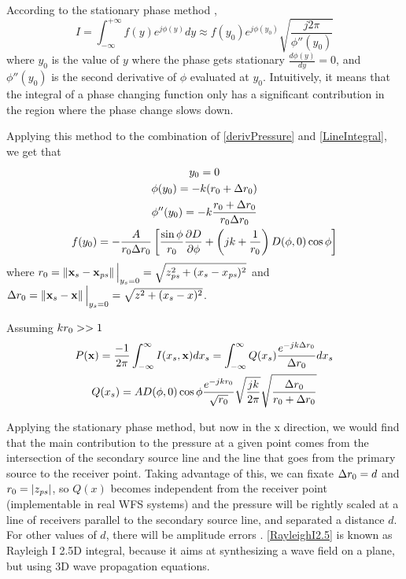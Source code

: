 According to the stationary phase method \cite{Verheijen},
\begin{equation}
I = \int_{-\infty}^{+\infty} f(y) e^{j\phi(y)} dy \approx f(y_0) e^{j\phi(y_0)} \sqrt{\frac{j 2\pi}{\phi''(y_0)}}
\end{equation}
where $y_0$ is the value of $y$ where the phase gets stationary $\frac{d\phi(y)}{dy} = 0$, and $\phi''(y_0)$ is the second derivative of $\phi$ evaluated at $y_0$. Intuitively, it means that the integral of a phase changing function only has a significant contribution in the region where the phase change slows down.

Applying this method to the combination of \autoref{derivPressure} and \autoref{LineIntegral}, we get that
\begin{gather}
	y_0 = 0 \\
	\phi(y_0) = -k(\distLinePrimSource + \distLinePoint) \\
	\phi''(y_0) = -k\frac{\distLinePrimSource + \distLinePoint}{\distLinePrimSource \distLinePoint} \\
	f(y_0) = -\frac{A}{\distLinePrimSource \distLinePoint}\left[ \frac{\sin\phi}{\distLinePrimSource} \frac{\partial\Diag}{\partial\phi} + \left(jk + \frac{1}{\distLinePrimSource}\right) \Diag(\phi, 0) \cos\phi \right]
\end{gather}
where $\distLinePrimSource = \norm{\PosTheo[surface] - \PosTheo[primarySource]}\Big\vert_{y_{\PosTheoSubInd[surface]} = 0} = \sqrt{z_{\PosTheoSubInd[primarySource]}^2 + (x_{\PosTheoSubInd[surface]} - x_{\PosTheoSubInd[primarySource]})^2}$ and $\distLinePoint = \norm{\PosTheo[surface] - \PosTheo}\Big\vert_{y_{\PosTheoSubInd[surface]} = 0} = \sqrt{z^2 + (x_{\PosTheoSubInd[surface]} - x)^2}$.

Assuming $kr_0 >> 1$
\begin{gather}
P(\PosTheo) = \frac{-1}{2\pi} \int_{-\infty}^{\infty} I(x_{\PosTheoSubInd[surface]}, \PosTheo) dx_{\PosTheoSubInd[surface]} = \int_{-\infty}^{\infty} Q(x_{\PosTheoSubInd[surface]})
\frac{e^{-jk\distLinePoint}}{\distLinePoint} dx_{\PosTheoSubInd[surface]} \label{RayleighI2.5}\\ 
Q(x_{\PosTheoSubInd[surface]}) = A \Diag(\phi, 0) \cos\phi \frac{e^{-jk \distLinePrimSource}}{\sqrt{\distLinePrimSource}} \sqrt{\frac{jk}{2\pi}} \sqrt{\frac{\distLinePoint}{\distLinePrimSource + \distLinePoint}}
\end{gather}

Applying the stationary phase method, but now in the x direction, we would find that the main contribution to the pressure at a given point comes from the intersection of the secondary source line and the line that goes from the primary source to the receiver point. Taking advantage of this, we can fixate $\Delta r_0 = d$ and $r_0 = \vert z_\mathit{ps} \vert$, so $Q(x)$ becomes independent from the receiver point (implementable in real WFS systems) and the pressure will be rightly scaled at a line of receivers parallel to the secondary source line, and separated a distance $d$. For other values of $d$, there will be amplitude errors \cite{Verheijen}. \autoref{RayleighI2.5} is known as Rayleigh I 2.5D integral, because it aims at synthesizing a wave field on a plane, but using 3D wave propagation equations.

